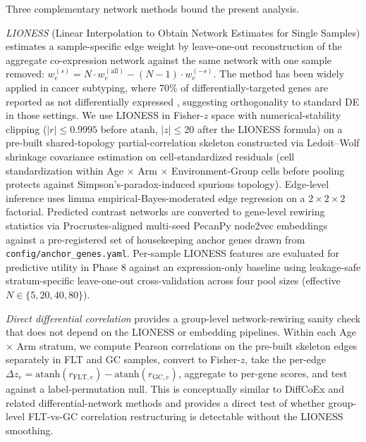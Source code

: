 \documentclass[11pt]{article}
\newcommand{\code}[1]{\texttt{#1}}
\newcommand{\pkg}[1]{\textsf{#1}}
\begin{document}
Three complementary network methods bound the present analysis.

\emph{LIONESS} (Linear Interpolation to Obtain Network Estimates for Single Samples) \citep{kuijjer2019estimating} estimates a sample-specific edge weight by leave-one-out reconstruction of the aggregate co-expression network against the same network with one sample removed: $w_e^{(s)} = N \cdot w_e^{(\text{all})} - (N{-}1)\cdot w_e^{(-s)}$. The method has been widely applied in cancer subtyping, where 70\% of differentially-targeted genes are reported as not differentially expressed \citep{lopes2020gene}, suggesting orthogonality to standard DE in those settings. We use LIONESS in Fisher-$z$ space with numerical-stability clipping ($|r|\leq 0.9995$ before $\mathrm{atanh}$, $|z|\leq 20$ after the LIONESS formula) on a pre-built shared-topology partial-correlation skeleton constructed via Ledoit--Wolf shrinkage covariance estimation \citep{ledoit2003honey} on cell-standardized residuals (cell standardization within Age $\times$ Arm $\times$ Environment-Group cells before pooling protects against Simpson's-paradox-induced spurious topology). Edge-level inference uses limma empirical-Bayes-moderated edge regression \citep{ritchie2015limma} on a $2\times 2\times 2$ factorial. Predicted contrast networks are converted to gene-level rewiring statistics via Procrustes-aligned multi-seed \pkg{PecanPy} \pkg{node2vec} embeddings \citep{grover2016node2vec, liu2021pecanpy} against a pre-registered set of housekeeping anchor genes drawn from \code{config/anchor\_genes.yaml}. Per-sample LIONESS features are evaluated for predictive utility in Phase 8 against an expression-only baseline using leakage-safe stratum-specific leave-one-out cross-validation across four pool sizes (effective $N\in\{5, 20, 40, 80\}$).

\emph{Direct differential correlation} provides a group-level network-rewiring sanity check that does not depend on the LIONESS or embedding pipelines. Within each Age $\times$ Arm stratum, we compute Pearson correlations on the pre-built skeleton edges separately in FLT and GC samples, convert to Fisher-$z$, take the per-edge $\Delta z_e = \mathrm{atanh}(r_{\text{FLT},e}) - \mathrm{atanh}(r_{\text{GC},e})$, aggregate to per-gene scores, and test against a label-permutation null. This is conceptually similar to DiffCoEx and related differential-network methods \citep{tesson2010diffcoex} and provides a direct test of whether group-level FLT-vs-GC correlation restructuring is detectable without the LIONESS smoothing.
\end{document}
